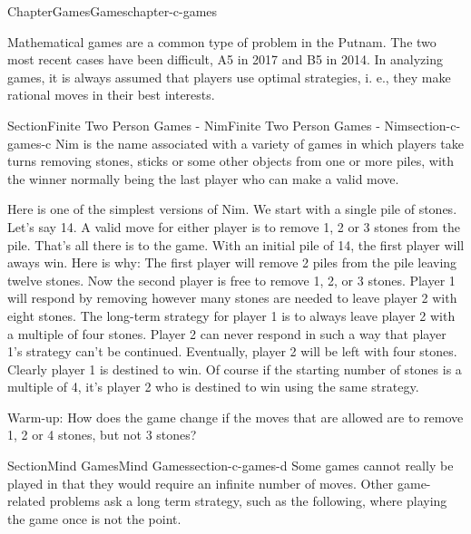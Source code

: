 \documentclass[oneside,10pt,]{book}
\numberwithin{equation}{section}
\begin{document}
\begin{chapterptx}{Chapter}{Games}{}{Games}{}{}{chapter-c-games}
\renewcommand*{\chaptername}{Chapter}
\begin{introduction}{}%
Mathematical games are a common type of problem in the Putnam. The two most recent cases have been difficult, A5 in 2017 and B5 in 2014.  In analyzing games, it is  always assumed that players use optimal strategies, i. e., they make rational moves in their best interests.%
\end{introduction}%
%
%
\typeout{************************************************}
\typeout{************************************************}
%
\begin{sectionptx}{Section}{Finite Two Person Games - Nim}{}{Finite Two Person Games - Nim}{}{}{section-c-games-c}
%
Nim is the name associated with a variety of games in which players take turns removing stones, sticks or some other objects from one or more piles, with the winner normally being the last player who can make a valid move.%
\par
Here is one of the simplest versions of Nim. We start with a single pile of stones. Let's say 14.  A valid move for either player is to remove 1, 2 or 3 stones from the pile. That's all there is to the game.  With an initial pile of 14, the first player will aways win.  Here is why:  The first player will remove 2 piles from the pile leaving twelve stones.   Now the second player is free to remove 1, 2, or 3 stones.  Player 1 will respond by removing however many stones are needed to leave player 2 with eight stones.  The long-term strategy for player 1 is to always leave player 2 with a multiple of four stones.   Player 2 can never respond in such a way that player 1's strategy can't be continued.  Eventually, player 2 will be left with four stones.   Clearly player 1 is destined to win.   Of course if the starting number of stones is a multiple of 4, it's player 2 who is destined to win using the same strategy.%
\par
Warm-up:  How does the game change if the moves that are allowed are to remove 1, 2 or 4 stones, but not 3 stones?%
\end{sectionptx}
%
%
\typeout{************************************************}
\typeout{************************************************}
%
\begin{sectionptx}{Section}{Mind Games}{}{Mind Games}{}{}{section-c-games-d}
Some games cannot really be played in that they would require an infinite number of moves. Other game-related problems ask a long term strategy, such as the following, where playing the game once is not the point.%

\end{sectionptx}
\end{chapterptx}
\end{document}
